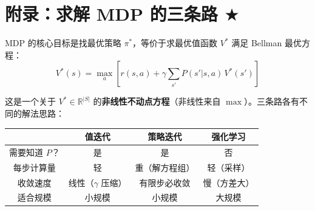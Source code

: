 \documentclass[12pt, a4paper]{ctexart}
\begin{document}
\section{附录：求解 MDP 的三条路 $\bigstar$}

\begin{blackboard}[三条路的出发点]

MDP 的核心目标是找最优策略 $\pi^*$，等价于求最优值函数 $V^*$ 满足 Bellman 最优方程：
\[
V^*(s) = \max_a \left[ r(s,a) + \gamma \sum_{s'} P(s'|s,a)\, V^*(s') \right]
\]

这是一个关于 $V^* \in \mathbb{R}^{|S|}$ 的\textbf{非线性不动点方程}（非线性来自 $\max$）。三条路各有不同的解法思路：

\begin{center}
\begin{tabular}{c|c|c|c}
 & 值迭代 & 策略迭代 & 强化学习 \\
\hline
需要知道 $P$？ & 是 & 是 & 否 \\
每步计算量 & 轻 & 重（解方程组） & 轻（采样） \\
收敛速度 & 线性（$\gamma$ 压缩） & 有限步必收敛 & 慢（方差大） \\
适合规模 & 小规模 & 小规模 & 大规模
\end{tabular}
\end{center}

\end{blackboard}
\end{document}
